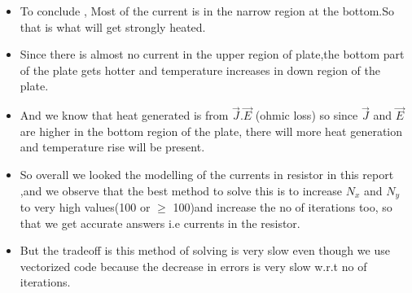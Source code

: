 \documentclass[11pt, a4paper]{article}
\begin{document}
  \begin{itemize}
  \item
    To conclude , Most of the current is in the narrow region at the
    bottom.So that is what will get strongly heated.
  \item
    Since there is almost no current in the upper region of plate,the
    bottom part of the plate gets hotter and temperature increases in down
    region of the plate.
  \item
    And we know that heat generated is from \(\vec{J}.\vec{E}\) (ohmic
    loss) so since \(\vec{J}\) and \(\vec{E}\) are higher in the bottom
    region of the plate, there will more heat generation and temperature
    rise will be present.
  \item
    So overall we looked the modelling of the currents in resistor in this
    report ,and we observe that the best method to solve this is to
    increase \(N_x\) and \(N_y\) to very high values(100 or \(\geq\)
    100)and increase the no of iterations too, so that we get accurate
    answers i.e currents in the resistor.
  \item
    But the tradeoff is this method of solving is very slow even though we
    use vectorized code because the decrease in errors is very slow w.r.t
    no of iterations.
  \end{itemize}
  
\end{document}

